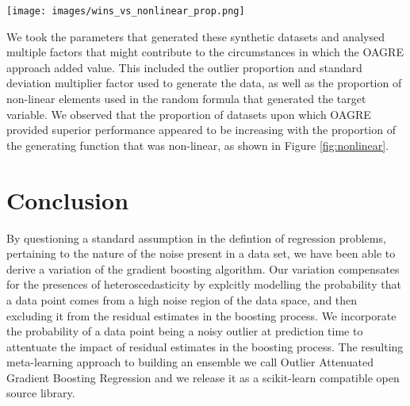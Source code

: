 \documentclass[graybox]{svmult}
\begin{document}
\begin{table}
\caption{Overall Results}
\label{tab:results}
\end{table}

\begin{figure*}
\centering
\texttt{[image: images/wins\_vs\_nonlinear\_prop.png]}
\caption{OAGRE Wins against Non-linear Elements in Target Function}
\label{fig:nonlinear}
\end{figure*}

We took the parameters that generated these synthetic datasets and analysed multiple factors that might contribute
to the circumstances in which the OAGRE approach added value. This included the outlier proportion and standard deviation
multiplier factor used to generate the data, as well as the proportion of non-linear elements used in the random formula that
generated the target variable. We observed that the proportion of datasets upon which OAGRE provided superior performance
appeared to be increasing with the proportion of the generating function that was non-linear, as shown in Figure \ref{fig:nonlinear}.

\section{Conclusion}

By questioning a standard assumption in the defintion of regression problems, pertaining to the nature of the noise 
present in a data set, we have been able to derive a variation of the gradient boosting algorithm. Our variation 
compensates for the presences of heteroscedasticity by explcitly modelling the probability that a data point comes
from a high noise region of the data space, and then excluding it from the residual estimates in the boosting process.
We incorporate the probability of a data point being a noisy outlier at prediction time to attentuate the impact of 
residual estimates in the boosting process. 
The resulting meta-learning approach to building an ensemble we call Outlier Attenuated Gradient
Boosting Regression and we release it as a scikit-learn compatible open source library. 
\end{document}
